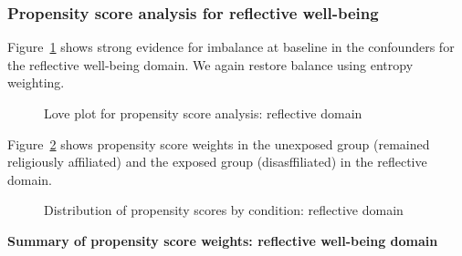 \documentclass[
  singlecolumn,
  9pt]{article}
\begin{document}
\subsubsection{Propensity score analysis for reflective
well-being}\label{propensity-score-analysis-for-reflective-well-being}

Figure~\ref{fig-love-reflective} shows strong evidence for imbalance at
baseline in the confounders for the reflective well-being domain. We
again restore balance using entropy weighting.

\begin{figure}


\caption{\label{fig-love-reflective}Love plot for propensity score
analysis: reflective domain}

\end{figure}%

Figure~\ref{fig-propensity-dis-reflective} shows propensity score
weights in the unexposed group (remained religiously affiliated) and the
exposed group (disasffiliated) in the reflective domain.

\begin{figure}


\caption{\label{fig-propensity-dis-reflective}Distribution of propensity
scores by condition: reflective domain}

\end{figure}%

\textbf{Summary of propensity score weights: reflective well-being
domain}
\end{document}
